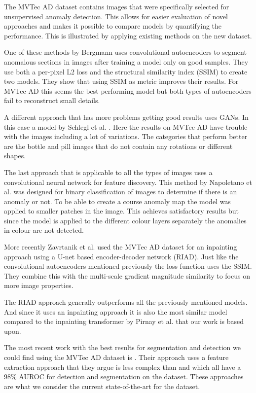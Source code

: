 The MVTec AD dataset contains images that were specifically selected for unsupervised anomaly detection. This allows for easier evaluation of novel approaches and makes it possible to compare models by quantifying the performance. This is illustrated by applying existing methods on the new dataset.

One of these methods by Bergmann \cite{bergmann_improving_2019} uses convolutional autoencoders to segment anomalous sections in images after training a model only on good samples. They use both a per-pixel L2 loss and the structural similarity index (SSIM) to create two models. They show that using SSIM as metric improves their results. For MVTec AD this seems the best performing model but both types of autoencoders fail to reconstruct small details.

A different approach that has more problems getting good results uses GANs. In this case a model by Schlegl et al. \cite{schlegl_unsupervised_2017}. Here the results on MVTec AD have trouble with the images including a lot of variations. The categories that perform better are the bottle and pill images that do not contain any rotations or different shapes.

The last approach that is applicable to all the types of images uses a convolutional neural network for feature discovery. This method by Napoletano et al. \cite{napoletano_anomaly_2018}   was designed for binary classification of images to determine if there is an anomaly or not. To be able to create a course anomaly map the model was applied to smaller patches in the image. This achieves satisfactory results but since the model is applied to the different colour layers separately the anomalies in colour are not detected.

More recently Zavrtanik et al. \cite{zavrtanik_reconstruction_2021} used the MVTec AD dataset for an inpainting approach using a U-net based encoder-decoder network (RIAD). Just like the convolutional autoencoders mentioned previously the loss function uses the SSIM. They combine this with the multi-scale gradient magnitude similarity \cite{xue_gradient_2014} to focus on more image properties.

The RIAD approach generally outperforms all the previously mentioned models. And since it uses an inpainting approach it is also the most similar model compared to the inpainting transformer by Pirnay et al. \cite{pirnay_inpainting_2021} that our work is based upon.

The most recent work with the best results for segmentation and detection we could find using the MVTec AD dataset is \cite{yu_fastflow_2021}. Their approach uses a feature extraction approach that they argue is less complex than  \cite{roth_towards_2021} and \cite{gudovskiy_cflow-ad_2021} which all have a 98\% AUROC for detection and segmentation on the dataset. These approaches are what we consider the current state-of-the-art for the dataset.

